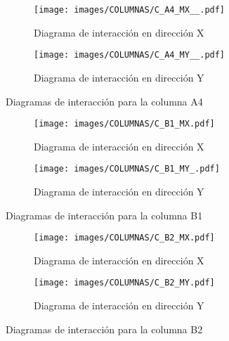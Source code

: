 
\begin{figure}[H]
     \centering
     \begin{subfigure}[b]{0.45\textwidth}
         \centering
         \texttt{[image: images/COLUMNAS/C\_A4\_MX\_\_.pdf]}
         \caption{Diagrama de interacción en dirección X}
         \label{fig:CA4 X}
     \end{subfigure}
     \hfill
     \begin{subfigure}[b]{0.45\textwidth}
         \centering
         \texttt{[image: images/COLUMNAS/C\_A4\_MY\_\_.pdf]}
         \caption{Diagrama de interacción en dirección Y}
         \label{fig:CA4 Y}
     \end{subfigure}
    
        \caption{Diagramas de interacción para la columna A4}
        \label{fig:A4}
\end{figure}


\begin{figure}[H]
     \centering
     \begin{subfigure}[b]{0.45\textwidth}
         \centering
         \texttt{[image: images/COLUMNAS/C\_B1\_MX.pdf]}
         \caption{Diagrama de interacción en dirección X}
         \label{fig:CB1 X}
     \end{subfigure}
     \hfill
     \begin{subfigure}[b]{0.45\textwidth}
         \centering
         \texttt{[image: images/COLUMNAS/C\_B1\_MY\_.pdf]}
         \caption{Diagrama de interacción en dirección Y}
         \label{fig:CB1 Y}
     \end{subfigure}
    
        \caption{Diagramas de interacción para la columna B1}
        \label{fig:B1}
\end{figure}


\begin{figure}[H]
     \centering
     \begin{subfigure}[b]{0.45\textwidth}
         \centering
         \texttt{[image: images/COLUMNAS/C\_B2\_MX.pdf]}
         \caption{Diagrama de interacción en dirección X}
         \label{fig:CB2 X}
     \end{subfigure}
     \hfill
     \begin{subfigure}[b]{0.45\textwidth}
         \centering
         \texttt{[image: images/COLUMNAS/C\_B2\_MY.pdf]}
         \caption{Diagrama de interacción en dirección Y}
         \label{fig:CB2 Y}
     \end{subfigure}
    
        \caption{Diagramas de interacción para la columna B2}
        \label{fig:B2}
\end{figure}

